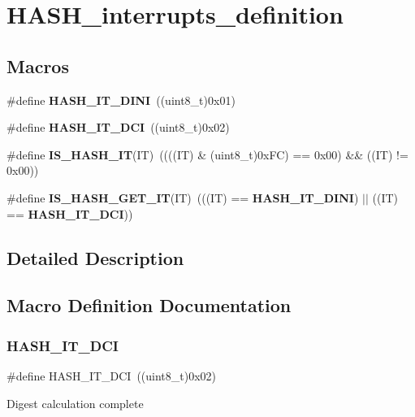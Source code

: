 \section{H\+A\+S\+H\+\_\+interrupts\+\_\+definition}
\label{group__HASH__interrupts__definition}
\subsection*{Macros}
\begin{DoxyCompactItemize}
\item 
\#define \textbf{ H\+A\+S\+H\+\_\+\+I\+T\+\_\+\+D\+I\+NI}~((uint8\+\_\+t)0x01)
\item 
\#define \textbf{ H\+A\+S\+H\+\_\+\+I\+T\+\_\+\+D\+CI}~((uint8\+\_\+t)0x02)
\item 
\#define \textbf{ I\+S\+\_\+\+H\+A\+S\+H\+\_\+\+IT}(IT)~((((IT) \& (uint8\+\_\+t)0x\+F\+C) == 0x00) \&\& ((\+I\+T) != 0x00))
\item 
\#define \textbf{ I\+S\+\_\+\+H\+A\+S\+H\+\_\+\+G\+E\+T\+\_\+\+IT}(IT)~(((IT) == \textbf{ H\+A\+S\+H\+\_\+\+I\+T\+\_\+\+D\+I\+NI}) $\vert$$\vert$ ((IT) == \textbf{ H\+A\+S\+H\+\_\+\+I\+T\+\_\+\+D\+CI}))
\end{DoxyCompactItemize}


\subsection{Detailed Description}


\subsection{Macro Definition Documentation}
\mbox{\label{group__HASH__interrupts__definition_gab5285b1618e3fac906d7502261d9bb38}} 
\subsubsection{H\+A\+S\+H\+\_\+\+I\+T\+\_\+\+D\+CI}
{\footnotesize\ttfamily \#define H\+A\+S\+H\+\_\+\+I\+T\+\_\+\+D\+CI~((uint8\+\_\+t)0x02)}

Digest calculation complete 

